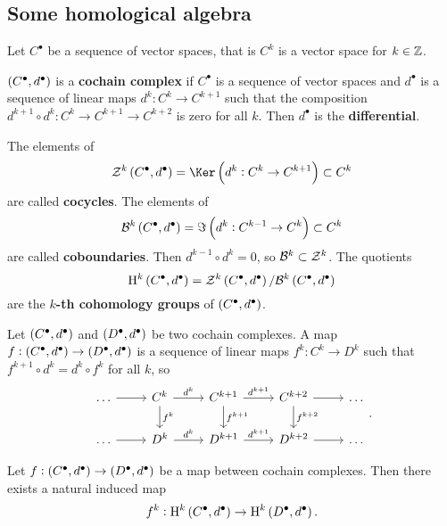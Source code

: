 \pagebreak

\subsection{Some homological algebra}

Let $ C^\bullet $ be a sequence of vector spaces, that is $ C^k $ is a vector space for $ k \in \mathbb{Z} $.

\begin{definition}
$ \br{C^\bullet, d^\bullet} $ is a \textbf{cochain complex} if $ C^\bullet $ is a sequence of vector spaces and $ d^\bullet $ is a sequence of linear maps $ d^k : C^k \to C^{k + 1} $ such that the composition $ d^{k + 1} \circ d^k : C^k \to C^{k + 1} \to C^{k + 2} $ is zero for all $ k $. Then $ d^\bullet $ is the \textbf{differential}.
\end{definition}

\begin{definition}
The elements of
$$ \ZZZ^k\br{C^\bullet, d^\bullet} = \Ker \br{d^k : C^k \to C^{k + 1}} \subset C^k $$
are called \textbf{cocycles}. The elements of
$$ \BBB^k\br{C^\bullet, d^\bullet} = \Im \br{d^k : C^{k - 1} \to C^k} \subset C^k $$
are called \textbf{coboundaries}. Then $ d^{k - 1} \circ d^k = 0 $, so $ \mathcal{B}^k \subset \mathcal{Z}^k $. The quotients
$$ \H^k\br{C^\bullet, d^\bullet} = \ZZZ^k\br{C^\bullet, d^\bullet} / \BBB^k\br{C^\bullet, d^\bullet} $$
are the \textbf{$ k $-th cohomology groups} of $ \br{C^\bullet, d^\bullet} $.
\end{definition}

\begin{definition}
Let $ \br{C^\bullet, d^\bullet} $ and $ \br{D^\bullet, d^\bullet} $ be two cochain complexes. A map $ f : \br{C^\bullet, d^\bullet} \to \br{D^\bullet, d^\bullet} $ is a sequence of linear maps $ f^k : C^k \to D^k $ such that $ f^{k + 1} \circ d^k = d^k \circ f^k $ for all $ k $, so
$$
\begin{tikzcd}
\dots \arrow{r} & C^k \arrow{r}{d^k} \arrow{d}{f^k} & C^{k + 1} \arrow{r}{d^{k + 1}} \arrow{d}{f^{k + 1}} & C^{k + 2} \arrow{r} \arrow{d}{f^{k + 2}} & \dots \\
\dots \arrow{r} & D^k \arrow{r}{d^k} & D^{k + 1} \arrow{r}{d^{k + 1}} & D^{k + 2} \arrow{r} & \dots
\end{tikzcd}.
$$
\end{definition}

\begin{proposition}
Let $ f : \br{C^\bullet, d^\bullet} \to \br{D^\bullet, d^\bullet} $ be a map between cochain complexes. Then there exists a natural induced map
$$ f^k : \H^k\br{C^\bullet, d^\bullet} \to \H^k\br{D^\bullet, d^\bullet}. $$
\end{proposition}

